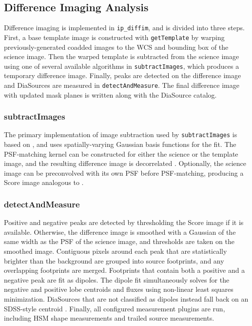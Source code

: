 \subsection{Difference Imaging Analysis}
\label{sec:dia}

Difference imaging is implemented in \texttt{ip\_diffim}, and is divided into three steps.
First, a base template image is constructed with \texttt{getTemplate} by warping previously-generated coadded images to the WCS and bounding box of the science image.
Then the warped template is subtracted from the science image using one of several available algorithms in \texttt{subtractImages}, which produces a temporary difference image.
Finally, peaks are detected on the difference image and DiaSources are measured in \texttt{detectAndMeasure}.
The final difference image with updated mask planes is written along with the DiaSource catalog.

\subsubsection{subtractImages}

The primary implementation of image subtraction used by \texttt{subtractImages} is based on \cite{1998ApJ...503..325A}, and uses spatially-varying Gaussian basis functions for the fit.
The PSF-matching kernel can be constructed for either the science or the template image, and the resulting difference image is decorrelated \citet{DMTN-021}.
Optionally, the science image can be preconvolved with its own PSF before PSF-matching, producing a Score image analogous to \citet{2016ApJ...830...27Z}.

\subsubsection{detectAndMeasure}

Positive and negative peaks are detected by thresholding the Score image if it is available.
Otherwise, the difference image is smoothed with a Gaussian of the same width as the PSF of the science image, and thresholds are taken on the smoothed image.
Contiguous pixels around each peak that are statistically brighter than the background are grouped into source footprints, and any overlapping footprints are merged.
Footprints that contain both a positive and a negative peak are fit as dipoles.
The dipole fit simultaneously solves for the negative and positive lobe centroids and fluxes using non-linear least squares minimization.
DiaSources that are not classified as dipoles instead fall back on an SDSS-style centroid \citep{2003AJ....125.1559P}.
Finally, all configured measurement plugins are run, including HSM shape measurements \citep{2003MNRAS.343..459H,2005MNRAS.361.1287M} and trailed source measurements.

